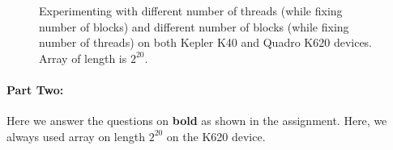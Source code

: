 \documentclass[12pt] {article}
\begin{document}
\begin{figure}[!tbh]
\centering        
    
   \caption{Experimenting with different number of threads (while fixing number of blocks) and different number of blocks (while fixing number of threads) on both Kepler K40 and Quadro K620 devices. Array of length is $2^{20}$.}
   \label{fig:part1}
\end{figure}


 

\paragraph{Part Two:}
Here we answer the questions on \textbf{bold} as shown in the assignment. Here, we always used array on length $2^{20}$ on the K620 device. 
\end{document}
